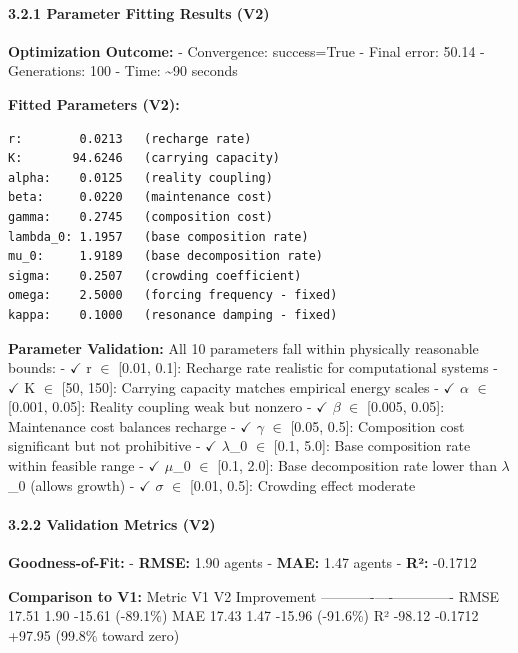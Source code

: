 \documentclass[
]{article}
\begin{document}
\paragraph{3.2.1 Parameter Fitting Results
(V2)}\label{parameter-fitting-results-v2}

\textbf{Optimization Outcome:} - Convergence: success=True - Final
error: 50.14 - Generations: 100 - Time: \textasciitilde90 seconds

\textbf{Fitted Parameters (V2):}

\begin{verbatim}
r:        0.0213   (recharge rate)
K:       94.6246   (carrying capacity)
alpha:    0.0125   (reality coupling)
beta:     0.0220   (maintenance cost)
gamma:    0.2745   (composition cost)
lambda_0: 1.1957   (base composition rate)
mu_0:     1.9189   (base decomposition rate)
sigma:    0.2507   (crowding coefficient)
omega:    2.5000   (forcing frequency - fixed)
kappa:    0.1000   (resonance damping - fixed)
\end{verbatim}

\textbf{Parameter Validation:} All 10 parameters fall within physically
reasonable bounds: - $\checkmark$ r $\in$ {[}0.01, 0.1{]}: Recharge rate realistic for
computational systems - $\checkmark$ K $\in$ {[}50, 150{]}: Carrying capacity matches
empirical energy scales - $\checkmark$ $\alpha$ $\in$ {[}0.001, 0.05{]}: Reality coupling weak
but nonzero - $\checkmark$ $\beta$ $\in$ {[}0.005, 0.05{]}: Maintenance cost balances
recharge - $\checkmark$ $\gamma$ $\in$ {[}0.05, 0.5{]}: Composition cost significant but not
prohibitive - $\checkmark$ $\lambda$\_0 $\in$ {[}0.1, 5.0{]}: Base composition rate within
feasible range - $\checkmark$ $\mu$\_0 $\in$ {[}0.1, 2.0{]}: Base decomposition rate lower
than $\lambda$\_0 (allows growth) - $\checkmark$ $\sigma$ $\in$ {[}0.01, 0.5{]}: Crowding effect
moderate

\paragraph{3.2.2 Validation Metrics (V2)}\label{validation-metrics-v2}

\textbf{Goodness-of-Fit:} - \textbf{RMSE:} 1.90 agents - \textbf{MAE:}
1.47 agents - \textbf{R²:} -0.1712

\textbf{Comparison to V1:} \textbar{} Metric \textbar{} V1 \textbar{} V2
\textbar{} Improvement \textbar{}
\textbar--------\textbar----\textbar----\textbar-------------\textbar{}
\textbar{} RMSE \textbar{} 17.51 \textbar{} 1.90 \textbar{} -15.61
(-89.1\%) \textbar{} \textbar{} MAE \textbar{} 17.43 \textbar{} 1.47
\textbar{} -15.96 (-91.6\%) \textbar{} \textbar{} R² \textbar{} -98.12
\textbar{} -0.1712 \textbar{} +97.95 (99.8\% toward zero) \textbar{}
\end{document}
